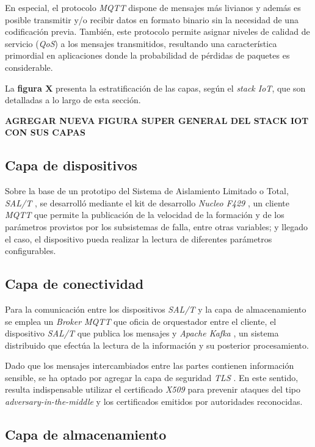 En especial, el protocolo \textit{MQTT} dispone de mensajes más livianos y además es posible transmitir y/o recibir datos en formato binario sin la necesidad de una codificación previa. También, este protocolo permite asignar niveles de calidad de servicio (\textit{QoS}) \cite{b7} a los mensajes transmitidos, resultando una característica primordial en aplicaciones donde la probabilidad de pérdidas de paquetes es considerable.

La \textbf{figura X} presenta la estratificación de las capas, según el \textit{stack IoT}, que son detalladas a lo largo de esta sección.


\textbf{AGREGAR NUEVA FIGURA SUPER GENERAL DEL STACK IOT CON SUS CAPAS}


\subsection{Capa de dispositivos}

Sobre la base de un prototipo del Sistema de Aislamiento Limitado o Total, \textit{SAL/T} \cite{b1}, se desarrolló mediante el kit de desarrollo \textit{Nucleo F429} \cite{b8}, un cliente \textit{MQTT} que permite la publicación de la velocidad de la formación y de los parámetros provistos por los subsistemas de falla, entre otras variables; y llegado el caso, el dispositivo pueda realizar la lectura de diferentes parámetros configurables.

\subsection{Capa de conectividad}

Para la comunicación entre los dispositivos \textit{SAL/T} y la capa de almacenamiento se emplea un \textit{Broker MQTT} que oficia de orquestador entre el cliente, el dispositivo \textit{SAL/T} que publica los mensajes y \textit{Apache Kafka} \cite{b9}, un sistema distribuido que efectúa la lectura de la información y su posterior procesamiento. 

Dado que los mensajes intercambiados entre las partes contienen información sensible, se ha optado por agregar la capa de seguridad \textit{TLS} \cite{b10}. En este sentido, resulta indispensable utilizar el certificado \textit{X509} \cite{b11} para prevenir ataques del tipo \textit{adversary-in-the-middle} \cite{b12} y los certificados emitidos por autoridades reconocidas.


\subsection{Capa de almacenamiento}

